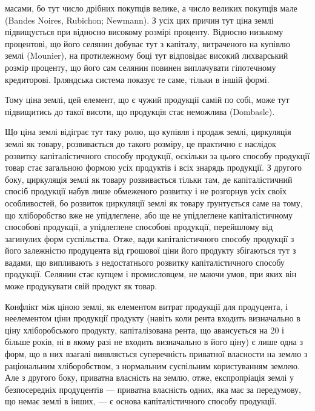 \parcont{}  %
масами, бо тут число дрібних покупців велике, а число великих покупців мале
(Bandes Noires, Rubichon; Newmann). З усіх цих причин тут ціна землі підвищується
при відносно високому розмірі проценту. Відносно низькому процентові,
що його селянин добуває тут з капіталу, витраченого на купівлю землі (Mounier),
на протилежному боці тут відповідає високий лихварський розмір проценту,
що його сам селянин повинен виплачувати гіпотечному кредиторові. Ірляндська
система показує те саме, тільки в іншій формі.

Тому ціна землі, цей елемент, що є чужий продукції самій по собі, може
тут підвищитись до такої висоти, що продукція стає неможлива (Dombasle).

Що ціна землі відіграє тут таку ролю, що купівля і продаж землі, циркуляція
землі як товару, розвивається до такого розміру, це практично є наслідок
розвитку капіталістичного способу продукції, оскільки за цього способу продукції
товар стає загальною формою усіх продуктів і всіх знарядь продукції. З другого
боку, циркуляція землі як товару розвивається тільки там, де капіталістичний
спосіб продукції набув лише обмеженого розвитку і не розгорнув усіх своїх
особливостей, бо розвиток циркуляції землі як товару ґрунтується саме на тому,
що хліборобство вже не упідлеглене, або ще не упідлеглене капіталістичному
способові продукції, а упідлеглене способові продукції, перейшлому від загинулих
форм суспільства. Отже, вади капіталістичного способу продукції з його
залежністю продуцента від грошової ціни його продукту збігаються тут з вадами,
що випливають з недостатнього розвитку капіталістичного способу продукції.
Селянин стає купцем і промисловцем, не маючи умов, при яких він може продукувати
свій продукт як товар.

Конфлікт між ціною землі, як елементом витрат продукції для продуцента,
і неелементом ціни продукції продукту (навіть коли рента входить визначально
в ціну хліборобського продукту, капіталізована рента, що авансується на 20
і більше років, ні в якому разі не входить визначально в його ціну) є лише
одна з форм, що в них взагалі виявляється суперечність приватної власности на
землю з раціональним хліборобством, з нормальним суспільним користуванням
землею. Але з другого боку, приватна власність на землю, отже, експропріація
землі у безпосередніх продуцентів — приватна власність одних, яка має
за передумову, що немає землі в інших, — є основа капіталістичного способу
продукції.

